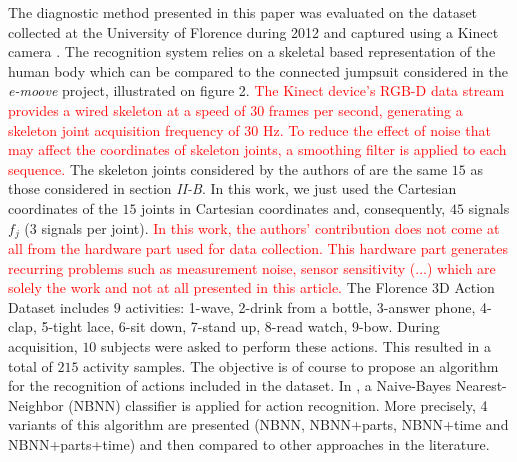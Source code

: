 \documentclass[letterpaper, 10 pt, conference]{ieeeconf}  %
\begin{document}
The diagnostic method presented in this paper was evaluated on the dataset collected at the University of Florence during 2012 and captured using a Kinect camera \cite{sei13}. The recognition system relies on a skeletal based representation of the human body which can be compared to the connected jumpsuit considered in the \textit{e-moove} project, illustrated on figure 2. \textcolor{red}{The Kinect device's RGB-D data stream provides a wired skeleton at a speed of 30 frames per second, generating a skeleton joint acquisition frequency of 30 Hz. To reduce the effect of noise that may affect the coordinates of skeleton joints, a smoothing filter is applied to each
sequence.} The skeleton joints considered by the authors of \cite{sei13} are the same $15$ as those considered in section \textit{II-B}. In this work, we just used the Cartesian coordinates of the $15$ joints in Cartesian coordinates and, consequently, $45$ signals $f_j$ ($3$ signals per joint). \textcolor{red}{In this work, the authors' contribution does not come at all from the hardware part used for data collection. This hardware part generates recurring problems such as measurement noise, sensor sensitivity  (...) which are solely the work \cite{sei13} and not at all presented in this article.}
The Florence 3D Action Dataset includes $9$ activities: 1-wave, 2-drink from a bottle, 3-answer phone, 4-clap, 5-tight lace, 6-sit down, 7-stand up, 8-read watch, 9-bow. During acquisition, $10$ subjects were asked to perform these actions. This resulted in a total of $215$ activity samples. The objective is of course to propose an algorithm for the recognition of actions included in the dataset. In \cite{sei13}, a Naive-Bayes Nearest-Neighbor (NBNN) classifier is applied for action recognition. More precisely, 4 variants of this algorithm are presented (NBNN, NBNN+parts, NBNN+time and NBNN+parts+time) and then compared to other approaches in the literature.\\
\end{document}
